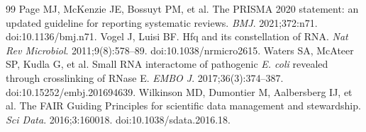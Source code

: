 \documentclass[11pt,a4paper]{article}
\begin{document}
\begin{thebibliography}{99}
 Page MJ, McKenzie JE, Bossuyt PM, et al. The PRISMA 2020 statement: an updated guideline for reporting systematic reviews. \emph{BMJ}. 2021;372:n71. doi:10.1136/bmj.n71.
 Vogel J, Luisi BF. Hfq and its constellation of RNA. \emph{Nat Rev Microbiol}. 2011;9(8):578--89. doi:10.1038/nrmicro2615.
 Waters SA, McAteer SP, Kudla G, et al. Small RNA interactome of pathogenic \emph{E. coli} revealed through crosslinking of RNase E. \emph{EMBO J}. 2017;36(3):374--387. doi:10.15252/embj.201694639.
 Wilkinson MD, Dumontier M, Aalbersberg IJ, et al. The FAIR Guiding Principles for scientific data management and stewardship. \emph{Sci Data}. 2016;3:160018. doi:10.1038/sdata.2016.18.
\end{thebibliography}


\end{document}

